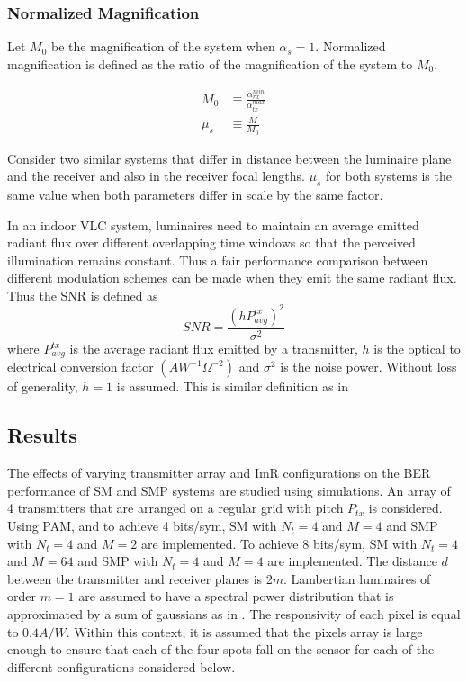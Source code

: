 \subsubsection{Normalized Magnification}
\label{subsubsec:osmImagingMagnification}
Let $M_0$ be the magnification of the system when $\alpha_{s}=1$. Normalized magnification is defined as the ratio of the magnification of the system to $M_0$.

\begin{eqnarray}
	M_{0} &\equiv \frac{\alpha_{rx}^{min}}{\alpha_{tx}^{max}}\label{eqM0}\\
	\mu_{s} &\equiv \frac{M}{M_{0}}\label{eqMS}
\end{eqnarray}

Consider two similar systems that differ in distance between the luminaire plane and the receiver and also in the receiver focal lengths. $\mu_{s}$ for both systems is the same value when both parameters differ in scale by the same factor.

In an indoor VLC system, luminaires need to maintain an average emitted radiant flux over different overlapping time windows so that the perceived illumination remains constant. Thus a fair performance comparison between different modulation schemes can be made when they emit the same radiant flux. Thus the SNR is defined as
\begin{equation}
	SNR = \frac{(hP_{avg}^{tx})^2}{\sigma^2}
\end{equation}
where $P_{avg}^{tx}$ is the average radiant flux emitted by a transmitter, $h$ is the optical to electrical conversion factor $(AW^{-1}\Omega^{-2})$ and $\sigma^2$ is the noise power. Without loss of generality, $h=1$ is assumed. This is similar definition as in \cite{fat13a}


\subsection{Results}
\label{subsec:osmResults}
The effects of varying transmitter array and ImR configurations on the BER performance of SM and SMP systems are studied using simulations. An array of 4 transmitters that are arranged on a regular grid with pitch $P_{tx}$ is considered. Using PAM, and to achieve 4 bits/sym, SM with $N_{t}=4$ and $M=4$ and SMP with $N_{t}=4$ and $M=2$ are implemented. To achieve 8 bits/sym, SM with $N_{t}=4$ and $M=64$ and SMP with $N_{t}=4$ and $M=4$ are implemented. The distance $d$ between the transmitter and receiver planes is 2$m$. Lambertian luminaires of order $m=1$ are assumed to have a spectral power distribution that is approximated by a sum of gaussians as in \cite{gru08b}. The responsivity of each pixel is equal to $0.4A/W$. Within this context, it is assumed that the pixels array is large enough to ensure that each of the four spots fall on the sensor for each of the different configurations considered below.

